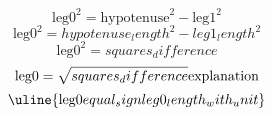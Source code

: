 \[\text{{{leg0}}}^{{2}}=\text{{{hypotenuse}}}^{{2}}-\text{{{leg1}}}^{{2}}\]
\[\text{{{leg0}}}^{{2}}={hypotenuse_length}^{{2}}-{leg1_length}^{{2}}\]
\[\text{{{leg0}}}^{{2}}={squares_difference}\]
\[\text{{{leg0}}}=\sqrt{{\mathstrut {squares_difference}}}\text{{{explanation}}}\]
\[\uline{{\text{{{leg0}}}{equal_sign}{leg0_length_with_unit}}}\]